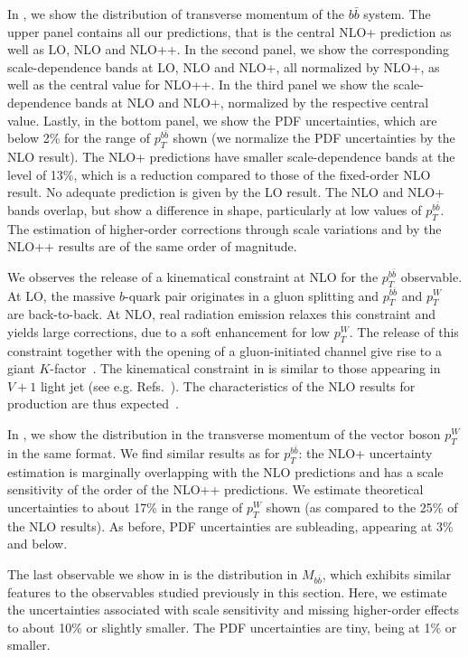 In , we show the distribution of transverse momentum of
the $b\bar b$ system. The upper panel contains all our predictions, that is the central
NLO+ prediction as well as LO, NLO and NLO++. In the second panel, we
show the corresponding scale-dependence bands at LO, NLO and NLO+, all normalized by NLO+, as well as the central value for
NLO++. In the third panel we show the scale-dependence bands at
NLO and NLO+, normalized by the respective central value. Lastly, in
the bottom panel, we show the PDF uncertainties, which are below
2\% for the range of $p_T^{b\bar b}$ shown (we normalize the PDF
uncertainties by the NLO result). The NLO+ predictions have smaller scale-dependence bands at the level
of 13\%, which is a reduction compared to those of the fixed-order
NLO result. No adequate prediction is given by the LO result. The NLO
and NLO+ bands overlap, but show a difference in shape, particularly
at low values of $p_T^{b\bar b}$. The estimation of higher-order corrections through scale variations and by the NLO++
results are of the same order of magnitude.



We observes the release of a kinematical constraint at NLO for the
$p_T^{b\bar b}$ observable. At LO, the massive $b$-quark pair
originates in a gluon splitting and $p_T^{b\bar b}$ and
$p_T^W$ are back-to-back. At NLO, real radiation emission relaxes this
constraint and yields large corrections, due to a soft enhancement for low $p_T^W$. The release of this constraint together with the opening of a gluon-initiated channel give rise to a giant $K$-factor~\cite{Rubin:2010xp}. The kinematical constraint in \Wbb{} is
similar to those appearing in $V+1$ light jet (see e.g.
Refs.~\cite{BH:W3jPRL,BH:W4j,BH:W5j}). The characteristics of
the NLO results for \Wbb{} production are thus expected~\cite{Catani:1997xc}.


In , we show the distribution in the transverse
momentum of the vector boson $p_T^W$ in the same format. We find similar results as for $p_T^{b\bar b}$: the NLO+ uncertainty
estimation is marginally
overlapping with the NLO predictions and has a scale sensitivity of the order
of the NLO++ predictions. We estimate theoretical uncertainties to about 17\% in the
range of $p_T^W$ shown (as compared to the 25\% of the NLO
results). As before, PDF uncertainties are
subleading, appearing at 3\% and below.

The last observable we show in  is the distribution in $M_{b\bar b}$, which exhibits similar features to the observables
studied previously in this section. Here, we estimate the uncertainties associated with scale
sensitivity and missing higher-order effects to about 10\% or slightly
smaller. The PDF uncertainties are tiny, being at 1\% or smaller. 


